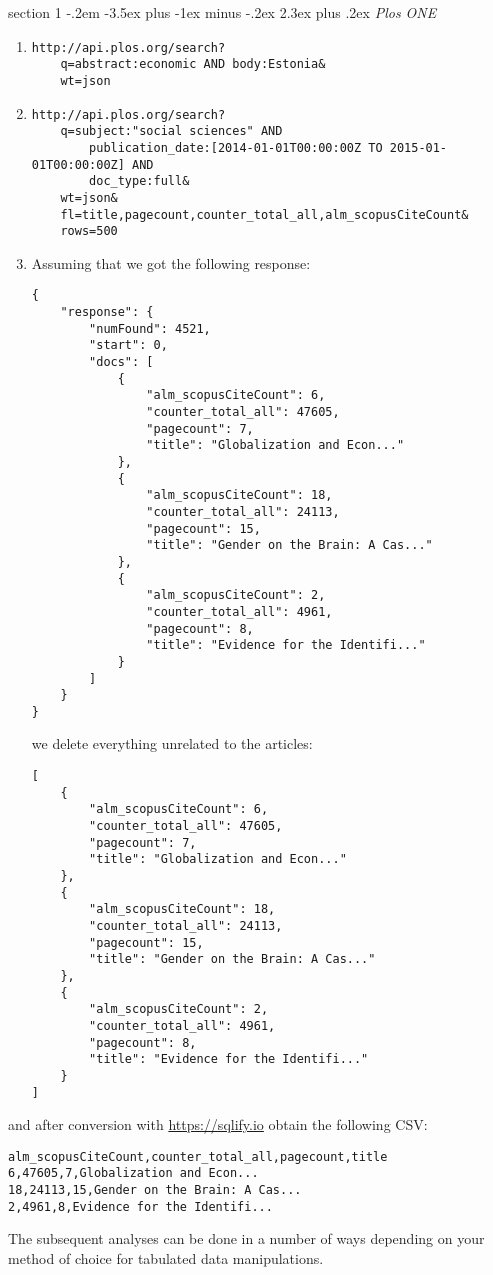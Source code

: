 \documentclass[12pt]{article}
\makeatletter
\newenvironment{problem}{\@startsection
	{section}
	{1}
	{-.2em}
	{-3.5ex plus -1ex minus -.2ex}
	{2.3ex plus .2ex}
	{\pagebreak[3]%
		\large\bf\noindent{Exercise }
	}
}
{\vspace{0.8cm}}
\makeatother
\begin{document}
	\begin{problem}{\it Plos ONE}
	
	
	\begin{enumerate}[label=\textbf{\alph*)},leftmargin=*]
		\item 	\begin{verbatim}
http://api.plos.org/search?
	q=abstract:economic AND body:Estonia&
	wt=json
		\end{verbatim}	
		
		\item  \begin{verbatim}
http://api.plos.org/search?
	q=subject:"social sciences" AND
		publication_date:[2014-01-01T00:00:00Z TO 2015-01-01T00:00:00Z] AND 
		doc_type:full&
	wt=json&
	fl=title,pagecount,counter_total_all,alm_scopusCiteCount&
	rows=500
		\end{verbatim}	
		
		\item Assuming that we got the following response:
		\begin{verbatim}
{
	"response": {
		"numFound": 4521,
		"start": 0,
		"docs": [
			{
				"alm_scopusCiteCount": 6,
				"counter_total_all": 47605,
				"pagecount": 7,
				"title": "Globalization and Econ..."
			},
			{
				"alm_scopusCiteCount": 18,
				"counter_total_all": 24113,
				"pagecount": 15,
				"title": "Gender on the Brain: A Cas..."
			},
			{
				"alm_scopusCiteCount": 2,
				"counter_total_all": 4961,
				"pagecount": 8,
				"title": "Evidence for the Identifi..."
			}
		]
	}
}
\end{verbatim}


	we delete everything unrelated to the articles:
		\begin{verbatim}
[
	{
		"alm_scopusCiteCount": 6,
		"counter_total_all": 47605,
		"pagecount": 7,
		"title": "Globalization and Econ..."
	},
	{
		"alm_scopusCiteCount": 18,
		"counter_total_all": 24113,
		"pagecount": 15,
		"title": "Gender on the Brain: A Cas..."
	},
	{
		"alm_scopusCiteCount": 2,
		"counter_total_all": 4961,
		"pagecount": 8,
		"title": "Evidence for the Identifi..."
	}
]
\end{verbatim}
	\end{enumerate}

	and after conversion with \url{https://sqlify.io} obtain the following CSV:
\begin{verbatim}
alm_scopusCiteCount,counter_total_all,pagecount,title
6,47605,7,Globalization and Econ...
18,24113,15,Gender on the Brain: A Cas...
2,4961,8,Evidence for the Identifi...
\end{verbatim}

	The subsequent analyses can be done in a number of ways depending on your method of choice for tabulated data manipulations.

\end{problem}
\end{document}
